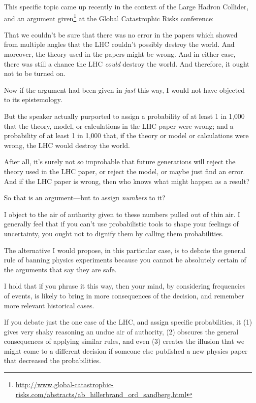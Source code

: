  This specific topic came up recently in the context of the Large
Hadron Collider, and an argument given\footnote{\url{http://www.global-catastrophic-risks.com/abstracts/ab_hillerbrand_ord_sandberg.html}} at the Global Catastrophic Risks
conference:


 That we couldn't be sure that there was no error
in the papers which showed from multiple angles that the LHC
couldn't possibly destroy the world. And moreover, the
theory used in the papers might be wrong. And in either case, there was
still a chance the LHC \textit{could} destroy the world. And therefore,
it ought not to be turned on.


 Now if the argument had been given in \textit{just} this way, I
would not have objected to its epistemology.


 But the speaker actually purported to assign a probability of at
least 1 in 1,000 that the theory, model, or calculations in the LHC
paper were wrong; and a probability of at least 1 in 1,000 that, if the
theory or model or calculations were wrong, the LHC would destroy the
world.


 After all, it's surely not so improbable that
future generations will reject the theory used in the LHC paper, or
reject the model, or maybe just find an error. And if the LHC paper is
wrong, then who knows what might happen as a result?


 So that is an argument---but to assign \textit{numbers} to it?


 I object to the air of authority given to these numbers pulled out
of thin air. I generally feel that if you can't use
probabilistic tools to shape your feelings of uncertainty, you ought
not to dignify them by calling them probabilities.


 The alternative I would propose, in this particular case, is to
debate the general rule of banning physics experiments because you
cannot be absolutely certain of the arguments that say they are safe.


 I hold that if you phrase it this way, then your mind, by
considering frequencies of events, is likely to bring in more
consequences of the decision, and remember more relevant historical
cases.


 If you debate just the one case of the LHC, and assign specific
probabilities, it (1) gives very shaky reasoning an undue air of
authority, (2) obscures the general consequences of applying similar
rules, and even (3) creates the illusion that we might come to a
different decision if someone else published a new physics paper that
decreased the probabilities.



